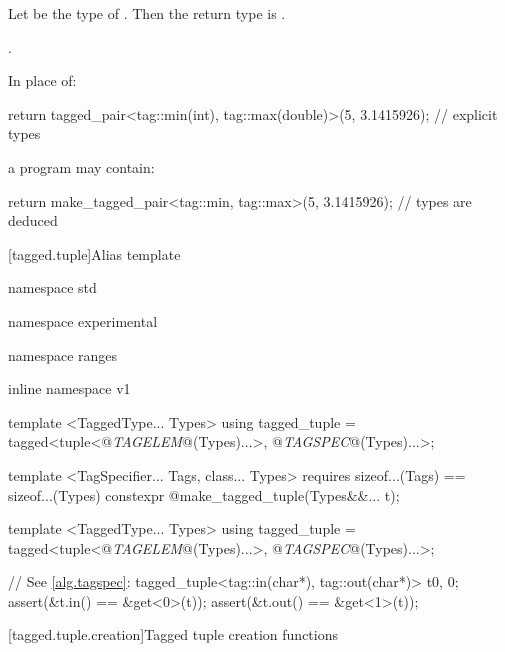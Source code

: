 \begin{itemdescr}
\pnum
Let  be the type of .
Then the return type is .

\pnum
\returns {}.

\pnum
\enterexample
In place of:

\begin{codeblock}
  return tagged_pair<tag::min(int), tag::max(double)>(5, 3.1415926);   // explicit types
\end{codeblock}

a \Cpp program may contain:

\begin{codeblock}
  return make_tagged_pair<tag::min, tag::max>(5, 3.1415926);           // types are deduced
\end{codeblock}
\exitexample
\end{itemdescr}

[tagged.tuple]{Alias template }

\pnum
{}

\begin{codeblock}
namespace std { namespace experimental { namespace ranges { inline namespace v1 {
  template <TaggedType... Types>
  using tagged_tuple = tagged<tuple<@\textit{TAGELEM}@(Types)...>,
                              @\textit{TAGSPEC}@(Types)...>;

  template <TagSpecifier... Tags, class... Types>
    requires sizeof...(Tags) == sizeof...(Types)
      constexpr @\seebelow@ make_tagged_tuple(Types&&... t);
}}}}
\end{codeblock}

\pnum
\begin{codeblock}
template <TaggedType... Types>
using tagged_tuple = tagged<tuple<@\textit{TAGELEM}@(Types)...>,
                            @\textit{TAGSPEC}@(Types)...>;
\end{codeblock}

\pnum \enterexample
\begin{codeblock}
// See \ref{alg.tagspec}:
tagged_tuple<tag::in(char*), tag::out(char*)> t{0, 0};
assert(&t.in() == &get<0>(t));
assert(&t.out() == &get<1>(t));
\end{codeblock}
\exitexample

[tagged.tuple.creation]{Tagged tuple creation functions}

